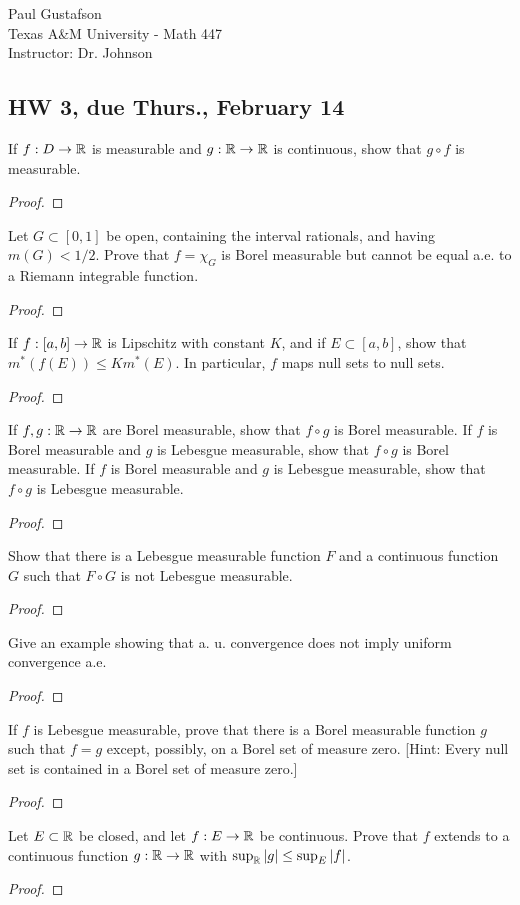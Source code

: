 \documentclass{article}
\begin{document}
\noindent Paul Gustafson\\
\noindent Texas A\&M University - Math 447\\ 
\noindent Instructor: Dr. Johnson

\subsection*{HW 3, due Thurs., February 14}
 If $f: D\to \mathbb{R}$ is measurable and $g: \mathbb{R} \to \mathbb{R}$ is continuous, show that $g \circ f$ is measurable.
\begin{proof}
\end{proof}
 Let $G \subset [0,1]$ be open, containing the interval rationals, and having $m(G) < 1/2$. Prove that $f = \chi_G$ is Borel measurable but cannot be equal a.e. to a Riemann integrable function.
\begin{proof}
\end{proof}
 If $f : [a,b] \to \mathbb{R}$ is Lipschitz with constant $K$, and if $E \subset [a,b]$, show that $m^*(f(E)) \le K m^*(E)$. In particular, $f$ maps null sets to null sets.
\begin{proof}
\end{proof}
 If $f,g: \mathbb{R} \to \mathbb{R}$ are Borel measurable, show that $f \circ g$ is Borel measurable. If $f$ is Borel measurable and $g$ is Lebesgue measurable, show that $f \circ g$ is Borel measurable.  If $f$ is Borel measurable and $g$ is Lebesgue measurable, show that $f \circ g$ is Lebesgue measurable.
\begin{proof}
\end{proof}
 Show that there is a Lebesgue measurable function $F$ and a continuous function $G$ such that $F \circ G$ is not Lebesgue measurable.
\begin{proof}
\end{proof}
 Give an example showing that a. u. convergence does not imply uniform convergence a.e.
\begin{proof}
\end{proof}
 If $f$ is Lebesgue measurable, prove that there is a Borel measurable function $g$ such that $f = g$ except, possibly, on a Borel set of measure zero. [Hint: Every null set is contained in a Borel set of measure zero.]
\begin{proof}
\end{proof}
 Let $E \subset \mathbb{R}$ be closed, and let $f:E\to \mathbb{R}$ be continuous. Prove that $f$ extends to a continuous function $g:\mathbb{R}\to\mathbb{R}$ with $\sup_{\mathbb{R}} |g| \le \sup_E |f|$.
\begin{proof}
\end{proof}
\end{document}
